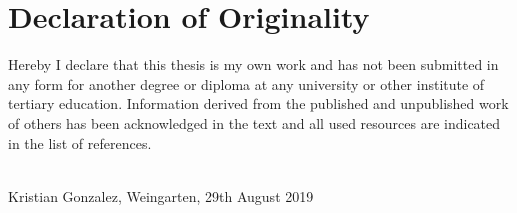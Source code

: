 \vspace*{1.5cm}

\section*{Declaration of Originality}
Hereby I declare that this thesis is my own work and has not been submitted in any form for another degree or diploma at any university or other institute of tertiary education. Information derived from the published and unpublished work of others has been acknowledged in the text and all used resources are indicated in the list of references.

\vspace{1cm}

\underline{\hspace{5cm}}\\

Kristian Gonzalez, Weingarten, 29th August 2019
